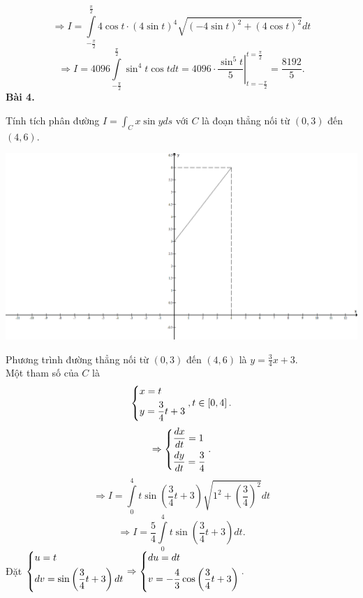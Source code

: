 \documentclass[12pt,a4paper]{article}
\begin{document}
\[ \Rightarrow I = \int\limits_{ - \frac{\pi }{2}}^{\frac{\pi }{2}} {4\cos t \cdot {{\left( {4\sin t} \right)}^4}\sqrt {{{\left( { - 4\sin t} \right)}^2} + {{\left( {4\cos t} \right)}^2}} dt} \]
\[ \Rightarrow I = 4096\int\limits_{ - \frac{\pi }{2}}^{\frac{\pi }{2}} {{{\sin }^4}t\cos tdt = \left. {4096 \cdot \frac{{{{\sin }^5}t}}{5}} \right|} _{t =  - \frac{\pi }{2}}^{t = \frac{\pi }{2}} = \frac{{8192}}{5}.\]
\textbf{Bài 4.}
\begin{mybox}
	Tính tích phân đường \(I = \int_C {x\sin yds} \) với \(C\) là đoạn 	
	thẳng nối từ \(\left( {0,3} \right)\) đến \(\left( {4,6} \right).\)
\end{mybox}
\begin{center}
	\includegraphics[scale=0.3]{c4_2}
\end{center}
Phương trình đường thẳng nối từ \(\left( {0,3} \right)\) đến \(\left( {4,6} \right)\) là \(y = \frac{3}{4}x + 3.\)\\
Một tham số của \(C\) là
\[\left\{ \begin{gathered}
  x = t \hfill \\
  y = \frac{3}{4}t + 3 \hfill \\ 
\end{gathered}  \right.,t \in \left[ {0,4} \right].\]
\[ \Rightarrow \left\{ \begin{gathered}
  \frac{{dx}}{{dt}} = 1 \hfill \\
  \frac{{dy}}{{dt}} = \frac{3}{4} \hfill \\ 
\end{gathered}  \right..\]
\[ \Rightarrow I = \int\limits_0^4 {t\sin \left( {\frac{3}{4}t + 3} \right)\sqrt {{1^2} + {{\left( {\frac{3}{4}} \right)}^2}} dt} \]
\[ \Rightarrow I = \frac{5}{4}\int\limits_0^4 {t\sin \left( {\frac{3}{4}t + 3} \right)dt}. \]
Đặt \(\left\{ \begin{gathered}
  u = t \hfill \\
  dv = \sin \left( {\frac{3}{4}t + 3} \right)dt \hfill \\ 
\end{gathered}  \right. \Rightarrow \left\{ \begin{gathered}
  du = dt \hfill \\
  v =  - \frac{4}{3}\cos \left( {\frac{3}{4}t + 3} \right) \hfill \\ 
\end{gathered}  \right..\)
\end{document}

